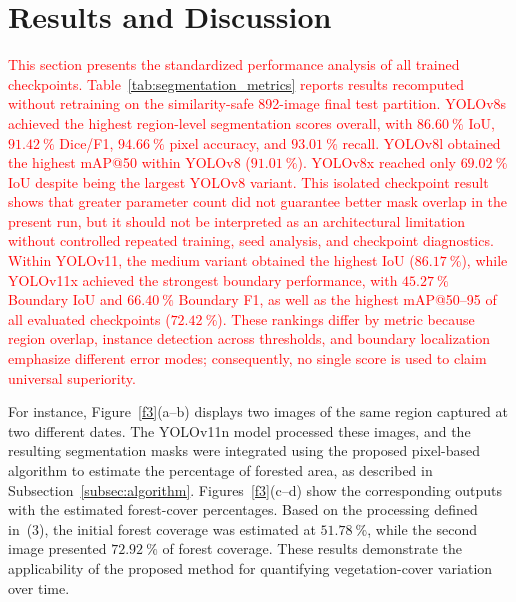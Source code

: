 \documentclass[journal,article,submit,pdftex,moreauthors]{Definitions/mdpi}
\begin{document}
\section{Results and Discussion}
\label{sec:results}

\textcolor{red}{This section presents the standardized performance analysis of all trained checkpoints. Table~\ref{tab:segmentation_metrics} reports results recomputed without retraining on the similarity-safe 892-image final test partition. YOLOv8s achieved the highest region-level segmentation scores overall, with $86.60~\%$ IoU, $91.42~\%$ Dice/F1, $94.66~\%$ pixel accuracy, and $93.01~\%$ recall. YOLOv8l obtained the highest mAP@50 within YOLOv8 ($91.01~\%$). YOLOv8x reached only $69.02~\%$ IoU despite being the largest YOLOv8 variant. This isolated checkpoint result shows that greater parameter count did not guarantee better mask overlap in the present run, but it should not be interpreted as an architectural limitation without controlled repeated training, seed analysis, and checkpoint diagnostics. Within YOLOv11, the medium variant obtained the highest IoU ($86.17~\%$), while YOLOv11x achieved the strongest boundary performance, with $45.27~\%$ Boundary IoU and $66.40~\%$ Boundary F1, as well as the highest mAP@50--95 of all evaluated checkpoints ($72.42~\%$). These rankings differ by metric because region overlap, instance detection across thresholds, and boundary localization emphasize different error modes; consequently, no single score is used to claim universal superiority.}

For instance, Figure~\ref{f3}(a--b) displays two images of the same region captured at two different dates. The YOLOv11n model processed these images, and the
resulting segmentation masks were integrated using the proposed pixel-based
algorithm to estimate the percentage of forested area, as described in
Subsection~\ref{subsec:algorithm}. Figures~\ref{f3}(c--d) show the
corresponding outputs with the estimated forest-cover percentages. Based on the
processing defined in~(3), the initial forest coverage was estimated at
$51.78~\%$, while the second image presented $72.92~\%$ of forest coverage.
These results demonstrate the applicability of the proposed method for
quantifying vegetation-cover variation over time.
\end{document}
